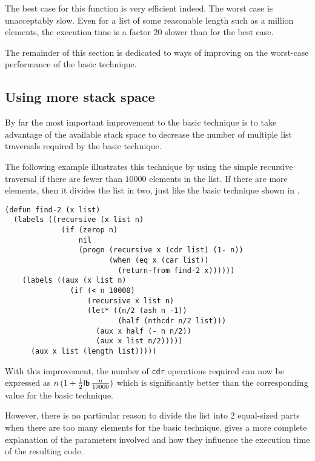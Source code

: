 The best case for this function is very efficient indeed.%
The worst case is unacceptably slow.  Even for a list of some
reasonable length such as a million elements, the execution time is a
factor $20$ slower than for the best case.

The remainder of this section is dedicated to ways of improving on the
worst-case performance of the basic technique.

\subsection{Using more stack space}

By far the most important improvement to the basic technique is to
take advantage of the available stack space to decrease the number of
multiple list traversals required by the basic technique.

The following example illustrates this technique by using the simple
recursive traversal if there are fewer than $10000$ elements in the
list.  If there are more elements, then it divides the list in two,
just like the basic technique shown in .

{\small\begin{verbatim}
(defun find-2 (x list)
  (labels ((recursive (x list n)
             (if (zerop n)
                 nil
                 (progn (recursive x (cdr list) (1- n))
                        (when (eq x (car list))
                          (return-from find-2 x))))))
    (labels ((aux (x list n)
               (if (< n 10000)
                   (recursive x list n)
                   (let* ((n/2 (ash n -1))
                          (half (nthcdr n/2 list)))
                     (aux x half (- n n/2))
                     (aux x list n/2)))))
      (aux x list (length list)))))
\end{verbatim}}

With this improvement, the number of \texttt{cdr} operations required
can now be expressed as $n\thinspace (1 +
\frac{1}{2}\mathsf{lb}\thinspace \frac{n}{10000})$%
which is significantly better than the corresponding value for the
basic technique.

However, there is no particular reason to divide the list into $2$
equal-sized parts when there are too many elements for the basic
technique.   gives a more complete explanation
of the parameters involved and how they influence the execution time
of the resulting code.

